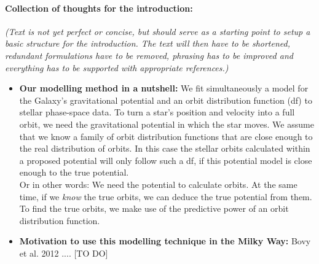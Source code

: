 \documentclass[12pt,preprint]{aastex}
\begin{document}
\paragraph{Collection of thoughts for the introduction:} \textit{(Text is not yet perfect or concise, but should serve as a starting point to setup a basic structure for the introduction. The text will then have to be shortened, redundant formulations have to be removed, phrasing has to be improved and everything has to be supported with appropriate references.)}
\begin{itemize}
\item \textbf{Our modelling method in a nutshell:} We fit simultaneously a model for the Galaxy's gravitational potential and an orbit distribution function (df) to stellar phase-space data. To turn a star's position and velocity into a full orbit, we need the gravitational potential in which the star moves. We assume that we know a family of orbit distribution functions that are close enough to the real distribution of orbits. In this case the stellar orbits calculated within a proposed potential will only follow such a df, if this potential model is close enough to the true potential.
\\Or in other words: We need the potential to calculate orbits. At the same time, if we \textit{know} the true orbits, we can deduce the true potential from them. To find the true orbits, we make use of the predictive power of an orbit distribution function.

\item \textbf{Motivation to use this modelling technique in the Milky Way:} Bovy et al. 2012 .... [TO DO]


\end{itemize}
\end{document}
